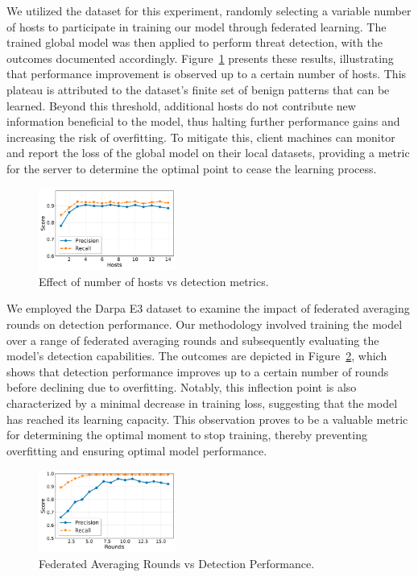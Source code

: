  We utilized the \optc dataset for this experiment, randomly selecting a variable number of hosts to participate in training our model through federated learning. The trained global model was then applied to perform threat detection, with the outcomes documented accordingly. Figure~\ref{scoresvshosts} presents these results, illustrating that performance improvement is observed up to a certain number of hosts. This plateau is attributed to the \optc dataset's finite set of benign patterns that can be learned. Beyond this threshold, additional hosts do not contribute new information beneficial to the model, thus halting further performance gains and increasing the risk of overfitting. To mitigate this, client machines can monitor and report the loss of the global model on their local datasets, providing a metric for the server to determine the optimal point to cease the learning process. \\

\begin{figure}[t!]
  \centering
  \includegraphics[width=0.4\textwidth]{fig/scoresvshosts.pdf}
  \caption{Effect of number of hosts vs detection metrics.}
  \label{scoresvshosts}
  \vspace{-2ex}
\end{figure}

 We employed the Darpa E3 dataset to examine the impact of federated averaging rounds on detection performance. Our methodology involved training the model over a range of federated averaging rounds and subsequently evaluating the model's detection capabilities. The outcomes are depicted in Figure~\ref{roundsvsscore}, which shows that detection performance improves up to a certain number of rounds before declining due to overfitting. Notably, this inflection point is also characterized by a minimal decrease in training loss, suggesting that the model has reached its learning capacity. This observation proves to be a valuable metric for determining the optimal moment to stop training, thereby preventing overfitting and ensuring optimal model performance.

\begin{figure}[t!]
  \centering
  \includegraphics[width=0.4\textwidth]{fig/roundsvsscore.pdf}
  \caption{Federated Averaging Rounds vs Detection Performance.}
  \label{roundsvsscore}
  \vspace{-2ex}
\end{figure}

